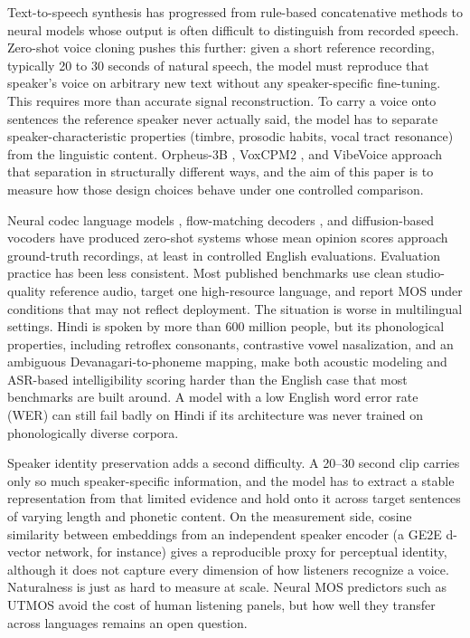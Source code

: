 \documentclass[conference]{IEEEtran}
\begin{document}
Text-to-speech synthesis has progressed from rule-based concatenative methods
to neural models whose output is often difficult to distinguish from recorded
speech. Zero-shot voice cloning pushes this further: given a short reference
recording, typically 20 to 30 seconds of natural speech, the model must
reproduce that speaker's voice on arbitrary new text without any
speaker-specific fine-tuning. This requires more than accurate signal
reconstruction. To carry a voice onto sentences the reference speaker never
actually said, the model has to separate speaker-characteristic properties
(timbre, prosodic habits, vocal tract resonance) from the linguistic content.
Orpheus-3B \cite{orpheus2024}, VoxCPM2 \cite{voxcpm2024}, and VibeVoice
\cite{vibevoice2024} approach that separation in structurally different ways,
and the aim of this paper is to measure how those design choices behave under
one controlled comparison.

Neural codec language models \cite{wang2023neural, borsos2023audiolm},
flow-matching decoders \cite{le2024voicebox}, and diffusion-based vocoders
have produced zero-shot systems whose mean opinion scores approach
ground-truth recordings, at least in controlled English evaluations.
Evaluation practice has been less consistent. Most published benchmarks use
clean studio-quality reference audio, target one high-resource language, and
report MOS under conditions that may not reflect deployment. The situation is
worse in multilingual settings. Hindi is spoken by more than 600 million
people, but its phonological properties, including retroflex consonants,
contrastive vowel nasalization, and an ambiguous Devanagari-to-phoneme
mapping, make both acoustic modeling and ASR-based intelligibility scoring
harder than the English case that most benchmarks are built around. A model
with a low English word error rate (WER) can still fail badly on Hindi if its
architecture was never trained on phonologically diverse corpora.

Speaker identity preservation adds a second difficulty. A 20--30 second clip
carries only so much speaker-specific information, and the model has to
extract a stable representation from that limited evidence and hold onto it
across target sentences of varying length and phonetic content. On the
measurement side, cosine similarity between embeddings from an independent
speaker encoder (a GE2E d-vector network, for instance) gives a reproducible
proxy for perceptual identity, although it does not capture every dimension of
how listeners recognize a voice. Naturalness is just as hard to measure at
scale. Neural MOS predictors such as UTMOS \cite{saeki2022utmos} avoid the
cost of human listening panels, but how well they transfer across languages
remains an open question.
\end{document}
